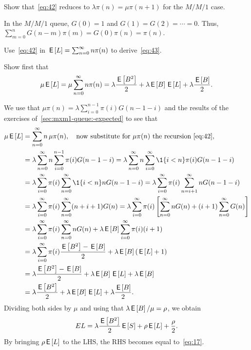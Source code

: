 \begin{exercise}\label{ex:27}
 Show that~\cref{eq:42} reduces to $\lambda \pi(n) = \mu \pi(n+1)$ for the $M/M/1$ case.
\begin{solution}
  In the $M/M/1$ queue, $G(0)=1$ and $G(1)=G(2)=\cdots = 0$.
  Thus, $\sum_{m=0}^n G(n-m) \pi(m) = G(0)\pi(n)=\pi(n)$.
\end{solution}
\end{exercise}



\begin{exercise}\label{ex:73}
Use~\cref{eq:42}
in $\,\mathsf{E}\left[L\right] = \sum_{n=0}^\infty n \pi(n)$ to derive~\cref{eq:43}.
\begin{hint}
  Show first that
\begin{equation*}
 \mu \,\mathsf{E}\left[L\right] =\mu \sum_{n=0}^\infty n \pi(n) = \lambda \frac{\,\mathsf{E}\left[B^2\right]}2 + \lambda \,\mathsf{E}\left[B\right] \,\mathsf{E}\left[L\right] +\lambda \frac{\,\mathsf{E}\left[B\right]}2.
\end{equation*}
\end{hint}
\begin{solution}
 We use that $\mu \pi(n) =\lambda \sum_{i=0}^{n-1} \pi(i) G(n-1-i)$ and the results of the exercises of~\cref{sec:mxm1-queue:-expected} to see that
\begin{align*}
 \mu \E \L
 &=\sum_{n=0}^\infty n\, \mu \pi(n), \quad \text{now substitute for $\mu \pi(n)$ the recursion~\cref{eq:42}}, \\
& =\lambda \sum_{n=0}^\infty n \sum_{i=0}^{n-1} \pi(i) G(n-1-i)
 =\lambda \sum_{n=0}^\infty n \sum_{i=0}^\infty \1{i<n} \pi(i) G(n-1-i) \\
& =\lambda \sum_{i=0}^\infty \pi(i) \sum_{n=0}^\infty \1{i<n} n G(n-1-i)
 =\lambda \sum_{i=0}^\infty \pi(i) \sum_{n=i+1}^\infty n G(n-1-i) \\
& =\lambda \sum_{i=0}^\infty \pi(i) \sum_{n=0}^\infty (n+i+1) G(n)
 =\lambda \sum_{i=0}^\infty \pi(i) \left[\sum_{n=0}^\infty n G(n) +(i+1) \sum_{n=0}^\infty G(n)\right] \\
 &=\lambda \sum_{i=0}^\infty \pi(i)\sum_{n=0}^\infty n G(n) +\lambda \E B \sum_{i=0}^\infty \pi(i) (i+1) \\
 &=\lambda \sum_{i=0}^\infty \pi(i) \frac{\E{B^2} -\E B}2 + \lambda \E B (\E \L +1) \\
 &= \lambda \frac{\E{B^2} -\E B}2 + \lambda \E B \E \L +\lambda \E B \\
 &= \lambda \frac{\E{B^2} }2 + \lambda \E B \E \L +\lambda \frac{\E B}2.
\end{align*}
Dividing both sides by $\mu$ and using that $\lambda \,\mathsf{E}\left[B\right]/\mu = \rho$, we obtain
\begin{equation*}
E L = \lambda \frac{\,\mathsf{E}\left[B^2\right]}2 \,\mathsf{E}\left[S\right] + \rho \,\mathsf{E}\left[L\right] + \frac\rho2.
\end{equation*}
By bringing $\rho \,\mathsf{E}\left[L\right]$ to the LHS, the RHS becomes equal to~\cref{eq:17}.
\end{solution}
\end{exercise}



